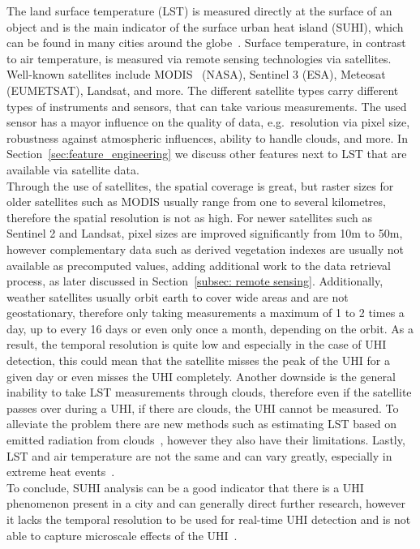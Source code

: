 The land surface temperature (LST) is measured directly at the surface of an object and is the main indicator of the surface urban heat island (SUHI), which can be found in many cities around the globe~\cite{peng2012surface}. Surface temperature, in contrast to air temperature, is measured via remote sensing technologies via satellites. Well-known satellites include MODIS~\cite{didan2021modis} (NASA), Sentinel 3 (ESA), Meteosat (EUMETSAT), Landsat, and more. The different satellite types carry different types of instruments and sensors, that can take various measurements. The used sensor has a mayor influence on the quality of data, e.g.\ resolution via pixel size, robustness against atmospheric influences, ability to handle clouds, and more. In Section~\ref{sec:feature_engineering} we discuss other features next to LST that are available via satellite data.\\
Through the use of satellites, the spatial coverage is great, but raster sizes for older satellites such as MODIS usually range from one to several kilometres, therefore the spatial resolution is not as high. For newer satellites such as Sentinel 2 and Landsat, pixel sizes are improved significantly from 10m to 50m, however complementary data such as derived vegetation indexes are usually not available as precomputed values, adding additional work to the data retrieval process, as later discussed in Section~\ref{subsec: remote sensing}.
Additionally, weather satellites usually orbit earth to cover wide areas and are not geostationary, therefore only taking measurements a maximum of 1 to 2 times a day, up to every 16 days or even only once a month, depending on the orbit. As a result, the temporal resolution is quite low and especially in the case of UHI detection, this could mean that the satellite misses the peak of the UHI for a given day or even misses the UHI completely. Another downside is the general inability to take LST measurements through clouds, therefore even if the satellite passes over during a UHI, if there are clouds, the UHI cannot be measured. To alleviate the problem there are new methods such as estimating LST based on emitted radiation from clouds~\cite{zhang2015estimation}, however they also have their limitations. Lastly, LST and air temperature are not the same and can vary greatly, especially in extreme heat events~\cite{good2016situ}.\\
To conclude, SUHI analysis can be a good indicator that there is a UHI phenomenon present in a city and can generally direct further research, however it lacks the temporal resolution to be used for real-time UHI detection and is not able to capture microscale effects of the UHI~\cite{voogt2003thermal, voelkel2017towards}.


